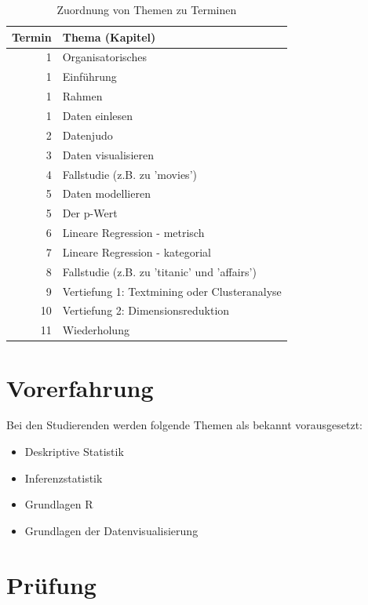 \documentclass[12pt,ngerman,]{book}
\providecommand{\tightlist}{%
  \setlength{\itemsep}{0pt}\setlength{\parskip}{0pt}}
\theoremstyle{definition}
\theoremstyle{definition}
\theoremstyle{remark}
\begin{document}
\begin{table}

\caption{\label{tab:termin-themen}Zuordnung von Themen zu Terminen}
\centering
\begin{tabular}[t]{r|l}
\hline
Termin & Thema (Kapitel)\\
\hline
1 & Organisatorisches\\
\hline
1 & Einführung\\
\hline
1 & Rahmen\\
\hline
1 & Daten einlesen\\
\hline
2 & Datenjudo\\
\hline
3 & Daten visualisieren\\
\hline
4 & Fallstudie (z.B. zu 'movies')\\
\hline
5 & Daten modellieren\\
\hline
5 & Der p-Wert\\
\hline
6 & Lineare Regression - metrisch\\
\hline
7 & Lineare Regression - kategorial\\
\hline
8 & Fallstudie (z.B. zu 'titanic' und 'affairs')\\
\hline
9 & Vertiefung 1: Textmining oder Clusteranalyse\\
\hline
10 & Vertiefung 2: Dimensionsreduktion\\
\hline
11 & Wiederholung\\
\hline
\end{tabular}
\end{table}

\section{Vorerfahrung}\label{vorerfahrung}

Bei den Studierenden werden folgende Themen als bekannt vorausgesetzt:

\begin{itemize}
\tightlist
\item
  Deskriptive Statistik
\item
  Inferenzstatistik
\item
  Grundlagen R
\item
  Grundlagen der Datenvisualisierung
\end{itemize}

\section{Prüfung}\label{prufung}
\end{document}
